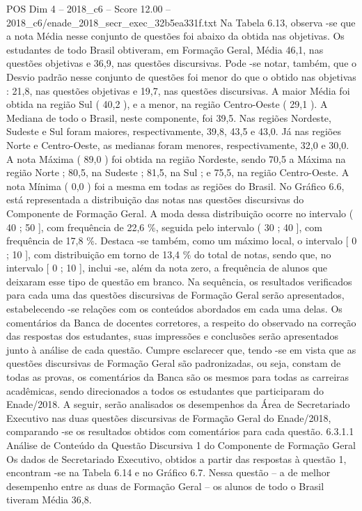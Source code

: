 \begin{textsample}{POS Dim 4 – 2018\_c6 – Score 12.00 – 2018\_c6/enade\_2018\_secr\_exec\_32b5ea331f.txt}
Na Tabela 6.13, observa -se que a nota Média nesse conjunto de questões foi abaixo da obtida nas objetivas.
Os estudantes de todo Brasil obtiveram, em Formação Geral, Média 46,1, nas questões objetivas e 36,9, nas questões discursivas.
Pode -se notar, também, que o Desvio padrão nesse conjunto de questões foi menor do que o obtido nas objetivas : 21,8, nas questões objetivas e 19,7, nas questões discursivas.
A maior Média foi obtida na região Sul ( 40,2 ), e a menor, na região Centro-Oeste ( 29,1 ).
A Mediana de todo o Brasil, neste componente, foi 39,5.
Nas regiões Nordeste, Sudeste e Sul foram maiores, respectivamente, 39,8, 43,5 e 43,0.
Já nas regiões Norte e Centro-Oeste, as medianas foram menores, respectivamente, 32,0 e 30,0.
A nota Máxima ( 89,0 ) foi obtida na região Nordeste, sendo 70,5 a Máxima na região Norte ; 80,5, na Sudeste ; 81,5, na Sul ; e 75,5, na região Centro-Oeste.
A nota Mínima ( 0,0 ) foi a mesma em todas as regiões do Brasil.
No Gráfico 6.6, está representada a distribuição das notas nas questões discursivas do Componente de Formação Geral.
A moda dessa distribuição ocorre no intervalo ( 40 ; 50 ], com frequência de 22,6 \%, seguida pelo intervalo ( 30 ; 40 ], com frequência de 17,8 \%.
Destaca -se também, como um máximo local, o intervalo [ 0 ; 10 ], com distribuição em torno de 13,4 \% do total de notas, sendo que, no intervalo [ 0 ; 10 ], inclui -se, além da nota zero, a frequência de alunos que deixaram esse tipo de questão em branco.
Na sequência, os resultados verificados para cada uma das questões discursivas de Formação Geral serão apresentados, estabelecendo -se relações com os conteúdos abordados em cada uma delas.
Os comentários da Banca de docentes corretores, a respeito do observado na correção das respostas dos estudantes, suas impressões e conclusões serão apresentados junto à análise de cada questão.
Cumpre esclarecer que, tendo -se em vista que as questões discursivas de Formação Geral são padronizadas, ou seja, constam de todas as provas, os comentários da Banca são os mesmos para todas as carreiras acadêmicas, sendo direcionados a todos os estudantes que participaram do Enade/2018.
A seguir, serão analisados os desempenhos da Área de Secretariado Executivo nas duas questões discursivas de Formação Geral do Enade/2018, comparando -se os resultados obtidos com comentários para cada questão. 6.3.1.1 Análise de Conteúdo da Questão Discursiva 1 do Componente de Formação Geral Os dados de Secretariado Executivo, obtidos a partir das respostas à questão 1, encontram -se na Tabela 6.14 e no Gráfico 6.7.
Nessa questão – a de melhor desempenho entre as duas de Formação Geral – os alunos de todo o Brasil tiveram Média 36,8.

\end{textsample}
